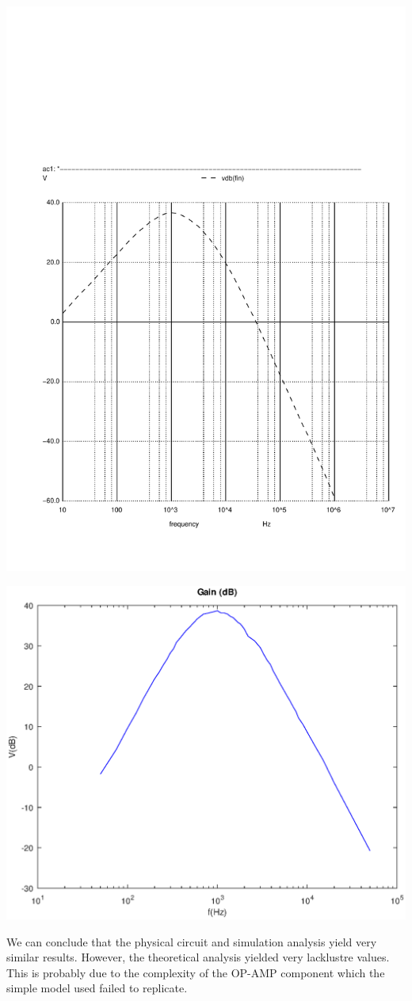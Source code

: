 \begin{minipage}[c]{0.50\linewidth}
\includegraphics[width=1\linewidth]{../sim/vo1f.pdf}
\end{minipage} %
\hspace{1mm}
\begin{minipage}[c]{0.50\linewidth}
\includegraphics[width=1\linewidth]{lab.eps}
\end{minipage}


\par
We can conclude that the physical circuit and simulation analysis yield very similar results.
However, the theoretical analysis yielded very lacklustre values. This is probably due to the complexity of the OP-AMP component which the simple model used failed to replicate.